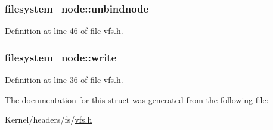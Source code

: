 \hypertarget{structfilesystem__node_a9b9b272d32b2dd8402bc00bc4cf58994}{
\subsubsection[{unbindnode}]{ {\bf filesystem\_\-node::unbindnode}}}
\label{structfilesystem__node_a9b9b272d32b2dd8402bc00bc4cf58994}


Definition at line 46 of file vfs.h.

\hypertarget{structfilesystem__node_aea69bcf76b190d8d85745816ed072e75}{
\subsubsection[{write}]{ {\bf filesystem\_\-node::write}}}
\label{structfilesystem__node_aea69bcf76b190d8d85745816ed072e75}


Definition at line 36 of file vfs.h.



The documentation for this struct was generated from the following file:\begin{DoxyCompactItemize}
\item 
Kernel/headers/fs/\hyperlink{vfs_8h}{vfs.h}\end{DoxyCompactItemize}
